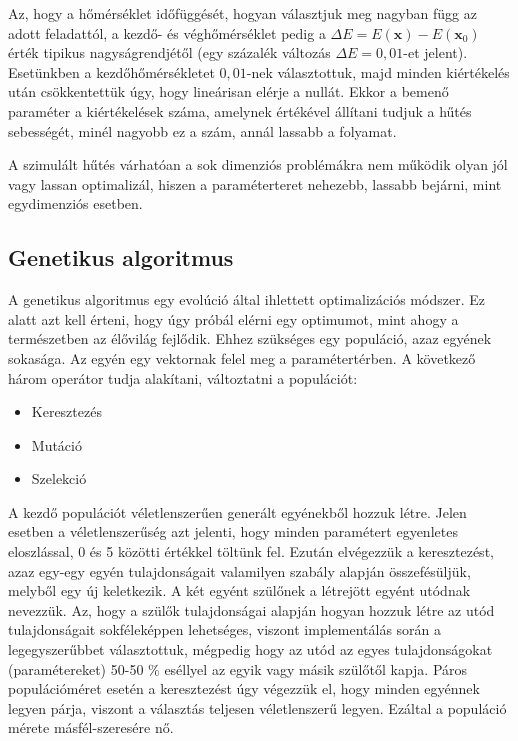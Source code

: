 \documentclass[12pt]{article}
\begin{document}
Az, hogy a hőmérséklet időfüggését, hogyan választjuk meg nagyban függ az adott feladattól, a kezdő- és véghőmérséklet pedig a $\Delta E = E(\mathbf{x}) - E(\mathbf{x}_0)$ érték tipikus nagyságrendjétől (egy százalék változás $\Delta E = 0{,}01$-et jelent). %
Esetünkben a kezdőhőmérsékletet $0{,}01$-nek választottuk, majd minden kiértékelés után csökkentettük úgy, hogy lineárisan elérje a nullát. Ekkor a bemenő paraméter a kiértékelések száma, amelynek értékével állítani tudjuk a hűtés sebességét, minél nagyobb ez a szám, annál lassabb a folyamat.

A szimulált hűtés várhatóan a sok dimenziós problémákra nem működik olyan jól vagy lassan optimalizál, hiszen a paraméterteret nehezebb, lassabb bejárni, mint egydimenziós esetben. %

\subsection{Genetikus algoritmus}
A genetikus algoritmus \cite{whitley1994genetic} egy evolúció által ihlettett optimalizációs módszer. Ez alatt azt kell érteni, hogy úgy próbál elérni egy optimumot, mint ahogy a természetben az élővilág fejlődik. Ehhez szükséges egy populáció, azaz egyének sokasága. Az egyén egy vektornak felel meg a paramétertérben. A következő három operátor tudja alakítani, változtatni a populációt:
\begin{itemize}
	\item Keresztezés
	\item Mutáció
	\item Szelekció
\end{itemize}
A kezdő populációt véletlenszerűen generált egyénekből hozzuk létre. Jelen esetben a véletlenszerűség azt jelenti, hogy minden paramétert egyenletes eloszlással,  0 és 5 közötti értékkel töltünk fel. Ezután elvégezzük a keresztezést, azaz egy-egy egyén tulajdonságait valamilyen szabály alapján összefésüljük, melyből egy új keletkezik. A két egyént szülőnek a létrejött egyént utódnak nevezzük. Az, hogy a szülők tulajdonságai alapján hogyan hozzuk létre az utód tulajdonságait sokféleképpen lehetséges, viszont implementálás során a legegyszerűbbet választottuk, mégpedig hogy az utód az egyes tulajdonságokat (paramétereket) 50-50 \% eséllyel az egyik vagy másik szülőtől kapja. Páros populációméret esetén a keresztezést úgy végezzük el, hogy minden egyénnek legyen párja, viszont a választás teljesen véletlenszerű legyen. Ezáltal a populáció mérete másfél-szeresére nő.
\end{document}
